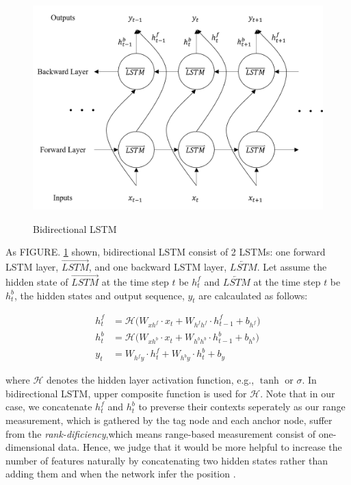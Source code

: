 \documentclass{ieeeaccess}
\begin{document}
\begin{figure}[h!]
	\centering
	\includegraphics[width=.9\linewidth]{bidirectional}
	\label{fig:bidirectional} 	
	\caption{Bidirectional LSTM}
\end{figure}

As FIGURE. \textcolor{red}{\ref{fig:bidirectional}} shown, bidirectional LSTM consist of 2 LSTMs: one forward LSTM layer, $\overrightarrow{LSTM}$, and one backward LSTM layer, $\overleftarrow{LSTM}$. Let assume the hidden state of $\overrightarrow{LSTM}$ at the time step $t$  be $h^{f}_{t}$ and $\overleftarrow{LSTM}$ at the time step $t$  be $h^{b}_{t}$, the hidden states and output sequence, $y_{t}$ are calcaulated as follows:

\begin{align}
h^{f}_{t} & =\mathcal{H}\big(W_{xh^{f}}\cdot x_{t}+W_{h^{f}h^{f}}\cdot h^{f}_{t-1}+b_{h^{f}}\big)\\
h^{b}_{t} & =\mathcal{H}\big(W_{xh^{b}}\cdot x_{t}+W_{h^{b}h^{b}}\cdot h^{b}_{t-1}+b_{h^{b}}\big)\\
y_{t} & =W_{h^{f}y}\cdot h^{f}_{t}+W_{h^{b}y}\cdot h^{b}_{t}+b_{y}
\end{align}


where $\mathcal{H}$ denotes the hidden layer activation function, e.g., $\tanh$ or $\sigma$. In bidirectional LSTM, upper composite function is used for $\mathcal{H}$. Note that in our case, we concatenate $h^{f}_{t}$ and $h^{b}_{t}$ to preverse their contexts seperately as our range measurement, which is gathered by the tag node and each anchor node, suffer from the \textit{rank-dificiency},which means range-based measurement consist of one-dimensional data\cite{fabresse2013undelayed}. Hence, we judge that it would be more helpful to increase the number of features naturally by concatenating two hidden states rather than adding them and when the network infer the position  .
\end{document}
